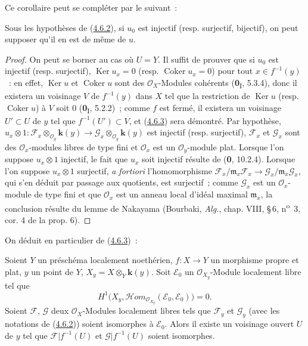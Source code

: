 Ce corollaire peut se compléter par le suivant~:

\begin{corollary}[4.6.3]
\label{III.4.6.3-fr}
Sous les hypothèses de \textup{(\hyperref[III.4.6.2-fr]{4.6.2})}, si $u_0$ est
injectif \textup{(resp.} surjectif, bijectif), on peut supposer qu'il en est de même de
$u$.
\end{corollary}

\begin{proof}
On peut se borner au cas où $U=Y$. Il suffit de prouver que si $u_0$ est
injectif (resp. surjectif), $\operatorname{Ker}u_x=0$ (resp.
$\operatorname{Coker}u_x=0$) pour tout $x\in f^{-1}(y)$~: en effet,
$\operatorname{Ker}u$ et $\operatorname{Coker}u$ sont des
$\mathcal O_X$-Modules cohérents (\textbf{0}\textsubscript{I}, 5.3.4), donc il
existera un voisinage $V$ de $f^{-1}(y)$ dans $X$ tel que la restriction de
$\operatorname{Ker}u$ (resp. $\operatorname{Coker}u$) à $V$ soit $0$
(\textbf{0}\textsubscript{I}, 5.2.2)~; comme $f$ est fermé, il existera un voisinage
$U'\subset U$ de $y$ tel que $f^{-1}(U')\subset V$, et
(\hyperref[III.4.6.3-fr]{4.6.3}) sera démontré. Par hypothèse,
$u_x\otimes1:
\mathcal F_x\otimes_{\mathcal O_y}\boldsymbol{k}(y)
\longrightarrow
\mathcal G_x\otimes_{\mathcal O_y}\boldsymbol{k}(y)$
est injectif (resp. surjectif),
$\mathcal F_x$ et $\mathcal G_x$ sont des
$\mathcal O_x$-modules libres de type fini et $\mathcal O_x$ est un
$\mathcal O_y$-module plat. Lorsque l'on suppose $u_x\otimes1$ injectif, le
fait que $u_x$ soit injectif résulte de (\textbf{0}, 10.2.4). Lorsque l'on suppose
$u_x\otimes1$ surjectif, \emph{a fortiori} l'homomorphisme
$\mathcal F_x/\mathfrak m_x\mathcal F_x
\longrightarrow
\mathcal G_x/\mathfrak m_x\mathcal G_x$,
qui s'en déduit par passage aux quotients, est surjectif~; comme
$\mathcal G_x$ est un $\mathcal O_x$-module de type fini et que
$\mathcal O_x$ est un anneau local d'idéal maximal $\mathfrak m_x$, la
conclusion résulte du lemme de Nakayama (Bourbaki, \emph{Alg.}, chap. VIII,
\S\,6, n\textsuperscript{o}~3, cor. 4 de la prop. 6).
\end{proof}

On déduit en particulier de (\hyperref[III.4.6.3-fr]{4.6.3})~:

\begin{corollary}[4.6.4]
\label{III.4.6.4-fr}
Soient $Y$ un préschéma localement noethérien, $f:X\to Y$ un morphisme propre
et plat, $y$ un point de $Y$, $X_y=X\otimes_Y\boldsymbol{k}(y)$. Soit $\mathcal E_0$ un
$\mathcal O_{X_y}$-Module localement libre tel que
\[
\label{III.4.6.4.1-fr}
H^1\bigl(X_y,
\mathcal{H}\!om_{\mathcal O_{X_y}}(\mathcal E_0,\mathcal E_0)\bigr)=0.
\tag{4.6.4.1}
\]
Soient $\mathcal F$, $\mathcal G$ deux $\mathcal O_X$-Modules localement
libres tels que $\mathcal F_y$ et $\mathcal G_y$ (avec les notations de
\textup{(\hyperref[III.4.6.2-fr]{4.6.2})}) soient isomorphes à $\mathcal E_0$. Alors
il existe un voisinage ouvert $U$ de $y$ tel que $\mathcal F|f^{-1}(U)$ et
$\mathcal G|f^{-1}(U)$ soient isomorphes.
\end{corollary}

